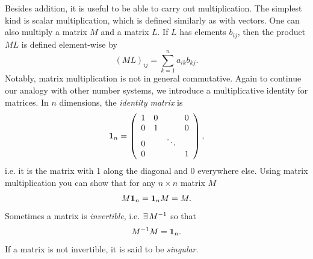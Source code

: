 Besides addition, it is useful to be able to carry out multiplication.
The simplest kind is scalar multiplication,
which is defined similarly as with vectors.
One can also multiply a matrix $M$ and a matrix $L$. If $L$ has elements
$b_{ij}$, then the product $ML$ is defined element-wise by
\begin{equation}
  (ML)_{ij}=\sum_{k=1}^n a_{ik}b_{kj}.
\end{equation}
Notably, matrix multiplication is not in general commutative.
Again to continue our analogy with other number systems,
we introduce a multiplicative identity for matrices.
In $n$ dimensions, the {\it identity matrix} is
\begin{equation}\index{identity!matrix}\index{matrix!identity}
  \id_n=\left(\begin{array}{cccc}
          1   & 0 &       & 0\\
          0   & 1 &       & 0\\
          0   &   & \ddots& \\
          0   &   &       & 1
            \end{array}\right), 
\end{equation}
i.e. it is the matrix with 1 along the diagonal and 0 everywhere else. Using
matrix multiplication you can show that for any $n\times n$ matrix $M$
\begin{equation}
  M{\mathbf 1}_n ={\mathbf 1}_n M = M.
\end{equation}
Sometimes a matrix is {\it invertible}, 
i.e. $\operatorname{\exists} M^{-1}$ so that
\begin{equation}
  M^{-1} M={\mathbf 1}_n. 
\end{equation}
If a matrix is not invertible, it is said to be 
{\it singular}.


